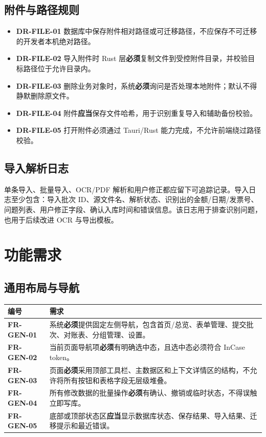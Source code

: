 \documentclass[UTF8,zihao=-4]{ctexart}
\newcommand{\req}[1]{\textbf{\textcolor{ivicBrown}{#1}}}
\newcommand{\must}{\textbf{必须}}
\newcommand{\should}{\textbf{应当}}
\begin{document}
\subsection{附件与路径规则}

\begin{itemize}
  \item \req{DR-FILE-01} 数据库中保存附件相对路径或可迁移路径，不应保存不可迁移的开发者本机绝对路径。
  \item \req{DR-FILE-02} 导入附件时 Rust 层\must{}复制文件到受控附件目录，并校验目标路径位于允许目录内。
  \item \req{DR-FILE-03} 删除业务对象时，系统\must{}询问是否处理本地附件；默认不得静默删除原文件。
  \item \req{DR-FILE-04} 附件\should{}保存文件哈希，用于识别重复导入和辅助备份校验。
  \item \req{DR-FILE-05} 打开附件必须通过 Tauri/Rust 能力完成，不允许前端绕过路径校验。
\end{itemize}

\subsection{导入解析日志}

单条导入、批量导入、OCR/PDF 解析和用户修正都应留下可追踪记录。导入日志至少包含：导入批次 ID、源文件名、解析状态、识别出的金额/日期/发票号、问题列表、用户修正字段、确认入库时间和错误信息。该日志用于排查识别问题，也用于后续改进 OCR 与导出模板。

\section{功能需求}

\subsection{通用布局与导航}

\begin{longtable}{p{2.8cm}p{11.6cm}}
\toprule
编号 & 需求 \\
\midrule
\req{FR-GEN-01} & 系统\must{}提供固定左侧导航，包含首页/总览、表单管理、提交批次、对账表、分组管理、设置。 \\
\req{FR-GEN-02} & 当前页面导航项\must{}有明确选中态，且选中态必须符合 InCase token。 \\
\req{FR-GEN-03} & 页面\must{}采用顶部工具栏、主数据区和上下文详情区的结构，不允许将所有按钮和表格字段无层级堆叠。 \\
\req{FR-GEN-04} & 所有修改数据的批量操作\must{}有确认、撤销或临时状态，不得误触立即写库。 \\
\req{FR-GEN-05} & 底部或顶部状态区\should{}显示数据库状态、保存结果、导入结果、迁移提示和最近错误。 \\
\bottomrule
\end{longtable}
\end{document}
